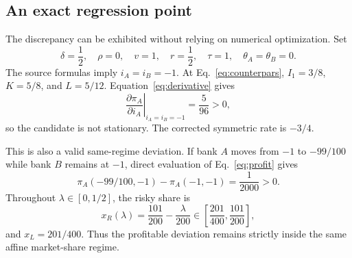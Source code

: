 \subsection{An exact regression point}
The discrepancy can be exhibited without relying on numerical optimization. Set
\begin{equation}\label{eq:counterpars}
\delta=\frac12,\quad \rho=0,\quad v=1,\quad r=\frac12,\quad
\tau=1,\quad \theta_A=\theta_B=0.
\end{equation}
The source formulas imply $i_A=i_B=-1$. At Eq.~\eqref{eq:counterpars}, $I_1=3/8$, $K=5/8$, and $L=5/12$. Equation~\eqref{eq:derivative} gives
\[
\left.\frac{\partial\pi_A}{\partial i_A}\right|_{i_A=i_B=-1}=\frac{5}{96}>0,
\]
so the candidate is not stationary. The corrected symmetric rate is $-3/4$.

This is also a valid same-regime deviation. If bank $A$ moves from $-1$ to $-99/100$ while bank $B$ remains at $-1$, direct evaluation of Eq.~\eqref{eq:profit} gives
\[
\pi_A(-99/100,-1)-\pi_A(-1,-1)=\frac{1}{2000}>0.
\]
Throughout $\lambda\in[0,1/2]$, the risky share is
\[
 x_R(\lambda)=\frac{101}{200}-\frac{\lambda}{200}\in\left[\frac{201}{400},\frac{101}{200}\right],
\]
and $x_L=201/400$. Thus the profitable deviation remains strictly inside the same affine market-share regime.
